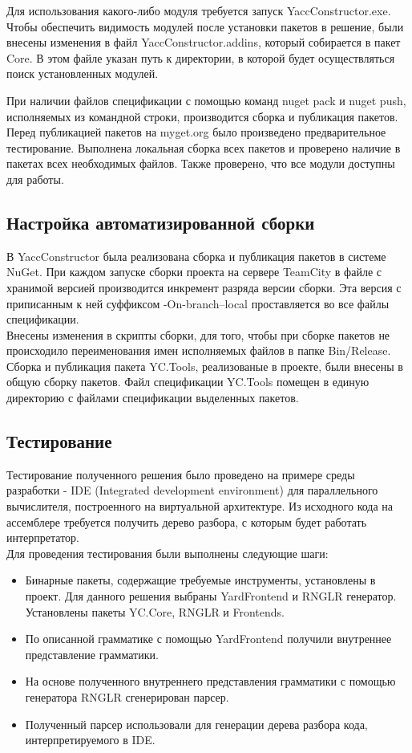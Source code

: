 \documentclass{matmex-diploma-custom}
\begin{document}
Для использования какого-либо модуля требуется запуск YaccConstructor.exe. Чтобы обеспечить видимость модулей после установки пакетов в решение, были внесены изменения в файл YaccConstructor.addins, который собирается в пакет Core.  В этом файле указан путь к директории, в которой будет осуществляться поиск установленных модулей. 

При наличии файлов спецификации с помощью команд nuget pack и nuget push, исполняемых из командной строки, производится сборка и публикация пакетов. 
Перед публикацией пакетов на myget.org было произведено предварительное тестирование. Выполнена локальная сборка всех пакетов и проверено наличие в пакетах всех необходимых файлов. Также  проверено, что все модули доступны для работы. 
\subsection{Настройка автоматизированной сборки} 
В YaccConstructor была реализована сборка и публикация пакетов в системе NuGet. При каждом запуске сборки проекта на сервере TeamCity в файле с хранимой версией производится инкремент разряда версии сборки. Эта версия с приписанным к ней суффиксом -On-branch--local проставляется во все файлы спецификации. \\
Внесены изменения в скрипты сборки, для того, чтобы при сборке пакетов не происходило переименования имен исполняемых файлов в папке Bin/Release. \\
Сборка и публикация пакета YC.Tools, реализованые в проекте, были внесены в общую сборку пакетов. Файл спецификации YC.Tools помещен в единую директорию с файлами спецификации выделенных пакетов. 
\subsection{Тестирование}
Тестирование полученного решения было проведено на примере среды разработки - IDE (Integrated development environment) для параллельного вычислителя, построенного на виртуальной архитектуре. Из исходного кода на ассемблере требуется получить дерево разбора, с которым будет работать интерпретатор.\\
Для проведения тестирования были выполнены следующие шаги:
\begin{itemize}
\item Бинарные пакеты, содержащие требуемые инструменты, установлены в проект.  Для данного решения выбраны YardFrontend и RNGLR генератор. Установлены пакеты YC.Core, RNGLR и Frontends. 
\item По описанной грамматике с помощью YardFrontend получили внутреннее представление грамматики.
\item На основе полученного внутреннего представления грамматики с помощью генератора RNGLR сгенерирован парсер. 
\item Полученный парсер использовали для генерации дерева разбора кода, интерпретируемого в IDE. 
\end{itemize}
\end{document}
